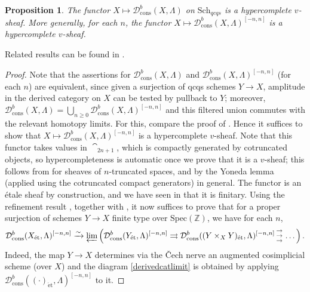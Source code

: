 \documentclass[reqno]{amsart}
\newcommand{\triplearrows}{\begin{smallmatrix} \to \\ \to \\ 
\to \end{smallmatrix} }
\newcommand{\spec}{\mathrm{Spec}}
\newcommand{\et}{\mathrm{\acute{e}t}}
\newcommand{\D}{\mathcal{D}}
\newtheorem{proposition}[theorem]{Proposition}
\theoremstyle{definition}
\begin{document}
\begin{proposition} 
\label{dbconsvsheaf}
The functor $X \mapsto \D^b_{\mathrm{cons}}(X, \Lambda)$ on $\mathrm{Sch}_{qcqs}$ is a
hypercomplete $v$-sheaf. 
More generally, for each $n$, the functor $X \mapsto \D^b_{\mathrm{cons}}(X, \Lambda)^{[-n, n]}$
is a hypercomplete $v$-sheaf. 
\end{proposition} 

Related results can be found in \cite{LaszloOlsson1}.

\begin{proof} 
Note that the assertions for 
$\D^b_{\mathrm{cons}}(X, \Lambda)$ and $\D^b_{\mathrm{cons}}(X, \Lambda)^{[-n, n]}$ (for each $n$) are equivalent,
since given a surjection of qcqs schemes $Y \to X$, amplitude in the derived
category on $X$ can be tested by pullback to $Y$; moreover, 
$\D^b_{\mathrm{cons}}(X, \Lambda) = \bigcup_{n \geq 0}
\D^b_{\mathrm{cons}}(X, \Lambda)^{[-n, n]}$ and this filtered union
commutes with the relevant homotopy limits. For this, compare the proof of
\cite[Th.~11.2]{BhattScholzeWitt}. 
Hence it suffices to show that 
$X \mapsto \D^b_{\mathrm{cons}}(X, \Lambda)^{[-n, n]}$ is a hypercomplete $v$-sheaf. 
Note that this functor
takes values in $\cat_{2n+1}$, which is compactly generated by cotruncated objects, so
hypercompleteness is automatic once we prove that it is a $v$-sheaf; this
follows from \cite[Lemma 6.5.2.9]{HTT} for sheaves of $n$-truncated spaces, and
by the Yoneda lemma (applied using the cotruncated compact generators) in general. The functor is an \'etale sheaf by construction, and we have seen in
 that it is finitary. 
Using the refinement result \cite[Th.~3.12]{Rydh}, together with 
,
it now suffices to prove that for a proper surjection of
schemes $Y \to X$ finite type over $\spec(\mathbb{Z})$, we have
for each $n$,
\begin{equation}  \D^b_{\mathrm{cons}}(X_{\et}, \Lambda)^{[-n, n]}
\xrightarrow{\sim} \varprojlim \left( \D^b_{\mathrm{cons}}( Y_{\et},
\Lambda)^{[-n, n]}
\rightrightarrows \D^b_{\mathrm{cons}}( (Y \times_X Y)_{\et}, \Lambda)^{[-n, n]} \triplearrows \dots
 \right).  \label{derivedcatlimit} \end{equation}
Indeed, the map $Y \to X$ determines via the \v{C}ech nerve an augmented cosimplicial
scheme (over $X$) and the diagram \eqref{derivedcatlimit} is obtained 
by applying $\D^b_{\mathrm{cons}}( (\cdot)_{\et}, \Lambda)^{[-n, n]}$ to it. 


\end{proof}
\end{document}
